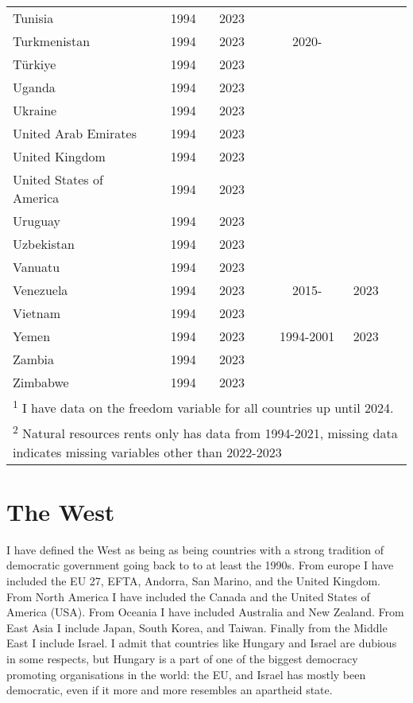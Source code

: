 {\begin{longtable}{lcccccc}
Tunisia & 1994 & 2023 &  &  &  & \\
Turkmenistan & 1994 & 2023 &  & 2020- &  & \\
\addlinespace
Türkiye & 1994 & 2023 &  &  &  & \\
Uganda & 1994 & 2023 &  &  &  & \\
Ukraine & 1994 & 2023 &  &  &  & \\
United Arab Emirates & 1994 & 2023 &  &  &  & \\
United Kingdom & 1994 & 2023 &  &  &  & \\
\addlinespace
United States of America & 1994 & 2023 &  &  &  & \\
Uruguay & 1994 & 2023 &  &  &  & \\
Uzbekistan & 1994 & 2023 &  &  &  & \\
Vanuatu & 1994 & 2023 &  &  &  & \\
Venezuela & 1994 & 2023 &  & 2015- & 2023 & \\
\addlinespace
Vietnam & 1994 & 2023 &  &  &  & \\
Yemen & 1994 & 2023 &  & 1994-2001 & 2023 & \\
Zambia & 1994 & 2023 &  &  &  & \\
Zimbabwe & 1994 & 2023 &  &  &  & \\
\bottomrule
\multicolumn{7}{l}{\rule{0pt}{1em}\textsuperscript{1} I have data on the freedom variable for all countries up until 2024.} \\ 
\multicolumn{7}{l}{\rule{0pt}{1em}\textsuperscript{2} Natural resources rents only has data from 1994-2021, missing data indicates missing variables other than 2022-2023} \\
\end{longtable}
}

\section{The West}
I have defined the West as being as being countries with a strong tradition of democratic government going back to to at least the 1990s. From europe I have included the EU 27, EFTA, Andorra, San Marino, and the United Kingdom. From North America I have included the Canada and the United States of America (USA). From Oceania I have included Australia and New Zealand. From East Asia I include Japan, South Korea, and Taiwan. Finally from the Middle East I include Israel. I admit that countries like Hungary and Israel are dubious in some respects, but Hungary is a part of one of the biggest democracy promoting organisations in the world: the EU, and Israel has mostly been democratic, even if it more and more resembles an apartheid state.

